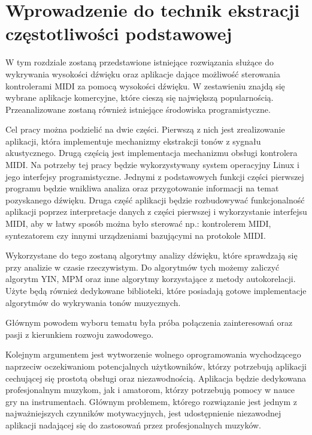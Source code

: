 \chapter{{Wprowadzenie do technik ekstracji częstotliwości podstawowej}}
\label{chapter:przeglad}

W tym rozdziale zostaną przedstawione istniejące rozwiązania służące do wykrywania wysokości dźwięku oraz aplikacje dające możliwość sterowania kontrolerami MIDI za pomocą wysokości dźwięku. W zestawieniu znajdą się wybrane aplikacje komercyjne, które cieszą się największą popularnością. Przeanalizowane zostaną również istniejące środowiska programistyczne.


Cel pracy można podzielić na dwie części. Pierwszą z nich jest zrealizowanie aplikacji, która implementuje mechanizmy ekstrakcji tonów z sygnału akustycznego. Drugą częścią jest implementacja mechanizmu obsługi kontrolera MIDI. Na potrzeby tej pracy będzie wykorzystywany system operacyjny Linux i jego interfejsy programistyczne. Jednymi z podstawowych funkcji części pierwszej programu będzie wnikliwa analiza oraz przygotowanie informacji na temat pozyskanego dźwięku. Druga część aplikacji będzie rozbudowywać funkcjonalność aplikacji poprzez interpretacje danych z części pierwszej i wykorzystanie interfejsu MIDI, aby w łatwy sposób można było sterować np.: kontrolerem MIDI, syntezatorem czy innymi urządzeniami bazującymi na protokole MIDI. 


	
Wykorzystane do tego zostaną algorytmy analizy dźwięku, które sprawdzają się przy analizie w czasie rzeczywistym. Do algorytmów tych możemy zaliczyć algorytm YIN, MPM oraz inne algorytmy korzystające z metody autokorelacji. Użyte będą również dedykowane biblioteki, które posiadają gotowe implementacje algorytmów do wykrywania tonów muzycznych.

Głównym powodem wyboru  tematu była próba połączenia zainteresowań oraz pasji z kierunkiem rozwoju zawodowego.
	
	
Kolejnym argumentem jest wytworzenie wolnego oprogramowania wychodzącego naprzeciw oczekiwaniom potencjalnych użytkowników, którzy potrzebują aplikacji cechującej się prostotą obsługi oraz niezawodnością. Aplikacja będzie dedykowana profesjonalnym muzykom, jak i amatorom, którzy potrzebują pomocy w nauce gry na instrumentach. Głównym problemem, którego rozwiązanie jest jednym z najważniejszych czynników motywacyjnych, jest udostępnienie niezawodnej aplikacji nadającej się do zastosowań przez profesjonalnych muzyków.


